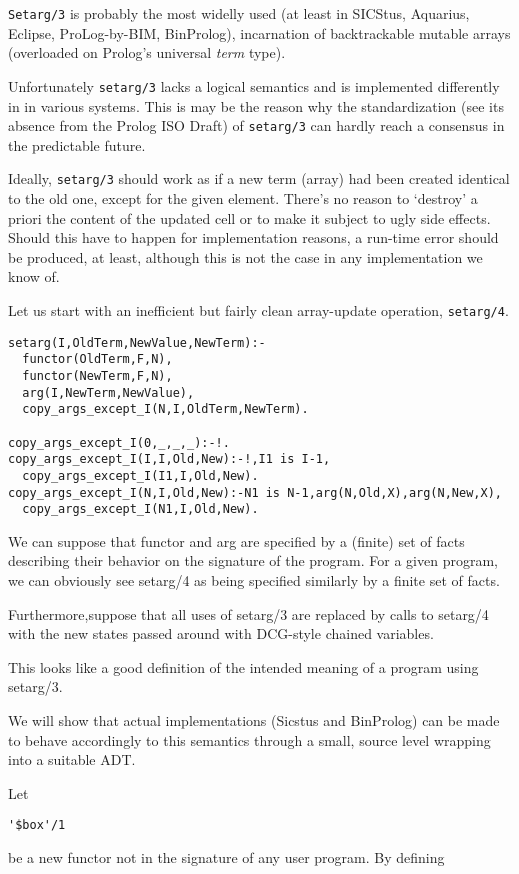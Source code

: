 \documentclass{article}
\begin{document}
{\tt Setarg/3} is probably
the most widelly used 
(at least in SICStus, Aquarius, Eclipse, ProLog-by-BIM, BinProlog), 
incarnation of backtrackable mutable arrays (overloaded
on Prolog's universal {\em term} type).

Unfortunately {\tt setarg/3} lacks
a logical semantics and is implemented differently in
in various systems. This is may be the reason
why the standardization (see its absence from the Prolog ISO Draft)
of {\tt setarg/3}
can hardly reach a consensus in the predictable future.

Ideally, {\tt setarg/3} should work as if a new term
(array) had been created
identical to the old one, except for the given element.
There's no reason to `destroy' a priori the content of the updated
cell or to make it subject to ugly side effects. Should this have
to happen for implementation reasons, a run-time error should
be produced, at least, although
this is not the case in any implementation
we know of.

Let us start with an inefficient but fairly clean array-update
operation, {\tt setarg/4}.

\begin{verbatim}
setarg(I,OldTerm,NewValue,NewTerm):-
  functor(OldTerm,F,N),
  functor(NewTerm,F,N),
  arg(I,NewTerm,NewValue),
  copy_args_except_I(N,I,OldTerm,NewTerm).

copy_args_except_I(0,_,_,_):-!.
copy_args_except_I(I,I,Old,New):-!,I1 is I-1,
  copy_args_except_I(I1,I,Old,New).
copy_args_except_I(N,I,Old,New):-N1 is N-1,arg(N,Old,X),arg(N,New,X),
  copy_args_except_I(N1,I,Old,New).
\end{verbatim}

We can suppose that functor and arg are specified by a (finite)
set of facts describing their behavior on
the signature of the program. For a given program,
we can obviously see setarg/4 as being
specified similarly by a finite set of facts. 

Furthermore,suppose that all
uses of setarg/3 are replaced by calls to setarg/4 with the new states
passed around with DCG-style chained variables.

This looks like a good definition of the intended meaning of
a program using setarg/3.

We will show that actual implementations (Sicstus and BinProlog)
can be made to behave accordingly to this semantics through a
small, source level wrapping into a suitable ADT.

Let 
\begin{verbatim}
'$box'/1
\end{verbatim}
be a new functor not in the signature of any
user program. By defining
\end{document}
